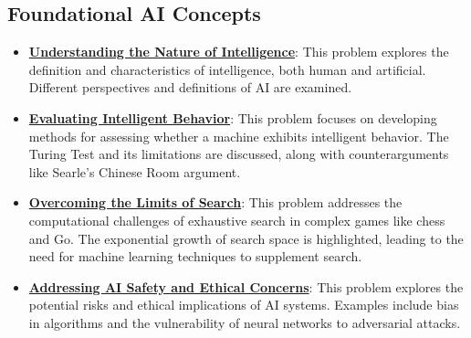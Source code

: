 \documentclass{article}%
\begin{document}
\subsection{Foundational AI Concepts}%
\label{subsec:FoundationalAIConcepts}%
\begin{itemize}[leftmargin=*]%
\item \href{\url{https://purdue.brightspace.com/d2l/common/assets/pdfjs-d2l-dist/1.0.14-legacy/web/viewer.html?file=\%252Fcontent\%252Fenforced\%252F1095467-wl.202510.CS.24300.001\%252F02L2-Intro.pdf\%253Fou\%253D1095467\&lang=en-us\&container=d2l-fileviewer-rendered-pdf\&fullscreen=d2l-fileviewer-rendered-pdf-dialog\&height=667}#page=5}{\textbf{Understanding the Nature of Intelligence}}: This problem explores the definition and characteristics of intelligence, both human and artificial. Different perspectives and definitions of AI are examined.%
\item \href{\url{https://purdue.brightspace.com/d2l/common/assets/pdfjs-d2l-dist/1.0.14-legacy/web/viewer.html?file=\%252Fcontent\%252Fenforced\%252F1095467-wl.202510.CS.24300.001\%252F02L2-Intro.pdf\%253Fou\%253D1095467\&lang=en-us\&container=d2l-fileviewer-rendered-pdf\&fullscreen=d2l-fileviewer-rendered-pdf-dialog\&height=667}#page=6}{\textbf{Evaluating Intelligent Behavior}}: This problem focuses on developing methods for assessing whether a machine exhibits intelligent behavior. The Turing Test and its limitations are discussed, along with counterarguments like Searle's Chinese Room argument.%
\item \href{\url{https://purdue.brightspace.com/d2l/common/assets/pdfjs-d2l-dist/1.0.14-legacy/web/viewer.html?file=\%252Fcontent\%252Fenforced\%252F1095467-wl.202510.CS.24300.001\%252F02L2-Intro.pdf\%253Fou\%253D1095467\&lang=en-us\&container=d2l-fileviewer-rendered-pdf\&fullscreen=d2l-fileviewer-rendered-pdf-dialog\&height=667}#page=11}{\textbf{Overcoming the Limits of Search}}: This problem addresses the computational challenges of exhaustive search in complex games like chess and Go. The exponential growth of search space is highlighted, leading to the need for machine learning techniques to supplement search.%
\item \href{\url{https://purdue.brightspace.com/d2l/common/assets/pdfjs-d2l-dist/1.0.14-legacy/web/viewer.html?file=\%252Fcontent\%252Fenforced\%252F1095467-wl.202510.CS.24300.001\%252F02L2-Intro.pdf\%253Fou\%253D1095467\&lang=en-us\&container=d2l-fileviewer-rendered-pdf\&fullscreen=d2l-fileviewer-rendered-pdf-dialog\&height=667}#page=19}{\textbf{Addressing AI Safety and Ethical Concerns}}: This problem explores the potential risks and ethical implications of AI systems. Examples include bias in algorithms and the vulnerability of neural networks to adversarial attacks.%

\end{itemize}
\end{document}

